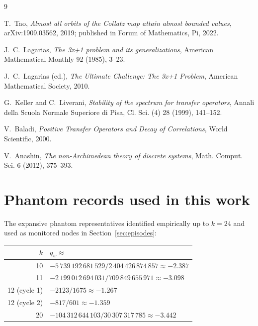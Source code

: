 \documentclass[11pt,a4paper]{article}
\theoremstyle{definition}
\begin{document}
\begin{thebibliography}{9}

T.~Tao,
\emph{Almost all orbits of the Collatz map attain almost bounded values},
arXiv:1909.03562, 2019; published in Forum of Mathematics, Pi, 2022.

J.~C.~Lagarias,
\emph{The 3x+1 problem and its generalizations},
American Mathematical Monthly 92 (1985), 3--23.

J.~C.~Lagarias (ed.),
\emph{The Ultimate Challenge: The 3x+1 Problem},
American Mathematical Society, 2010.

G.~Keller and C.~Liverani,
\emph{Stability of the spectrum for transfer operators},
Annali della Scuola Normale Superiore di Pisa, Cl. Sci. (4) 28 (1999), 141--152.

V.~Baladi,
\emph{Positive Transfer Operators and Decay of Correlations},
World Scientific, 2000.

V.~Anashin,
\emph{The non-Archimedean theory of discrete systems},
Math. Comput. Sci. 6 (2012), 375--393.

\end{thebibliography}

\appendix

\section{Phantom records used in this work}
\label{app:phantoms}

The expansive phantom representatives identified empirically up to
$k = 24$ and used as monitored nodes in Section~\ref{sec:episodes}:

\begin{center}
\begin{tabular}{rl}
\toprule
$k$ & $q_w \approx$ \\
\midrule
10 & $-5\,739\,192\,681\,529 / 2\,404\,426\,874\,857 \approx -2.387$ \\
11 & $-2\,199\,012\,694\,031 / 709\,849\,655\,971 \approx -3.098$ \\
12 (cycle 1) & $-2123 / 1675 \approx -1.267$ \\
12 (cycle 2) & $-817 / 601 \approx -1.359$ \\
20 & $-104\,312\,644\,103 / 30\,307\,317\,785 \approx -3.442$ \\
\bottomrule
\end{tabular}
\end{center}
\end{document}
